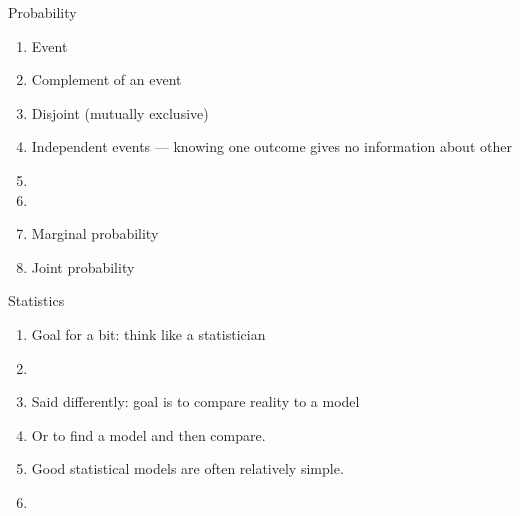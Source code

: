 \documentclass{article}
\begin{document}
Probability
\begin{enumerate}
\item Event
\item Complement of an event
\item Disjoint (mutually exclusive)
\item Independent events --- knowing one outcome gives no information about other
\item {}
\item {}
\item Marginal probability
\item Joint probability
\end{enumerate}

Statistics
\begin{enumerate}
\item Goal for a bit: think like a statistician
\item {}
\item Said differently: goal is to compare reality to a model
\item Or to find a model and then compare.
\item Good statistical models are often relatively simple.
\item {}
\end{enumerate}
\end{document}
